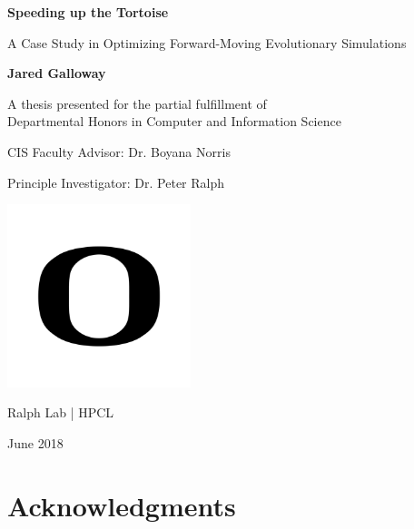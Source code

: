 \documentclass{article}
\begin{document}
\linespread{1.0}

\begin{titlepage}
    \begin{center}
        \vspace*{1cm}
        
        \textbf{Speeding up the Tortoise}
        
        \vspace{0.5cm}
        A Case Study in Optimizing Forward-Moving Evolutionary Simulations
        
        \vspace{1.3cm}
        
        \textbf{Jared Galloway}
        
        \vfill
        
        
        A thesis presented for the partial fulfillment of\\
        Departmental Honors in Computer and Information Science
        
         CIS Faculty Advisor: Dr. Boyana Norris
        
        Principle Investigator: Dr. Peter Ralph
        
        \vspace{0.8cm}
        
        \includegraphics[width=0.4\textwidth]{../figures/Oregon}
        
        Ralph Lab | HPCL
        
        June 2018
        
    \end{center}
\end{titlepage}


\section*{Acknowledgments}
\end{document}

